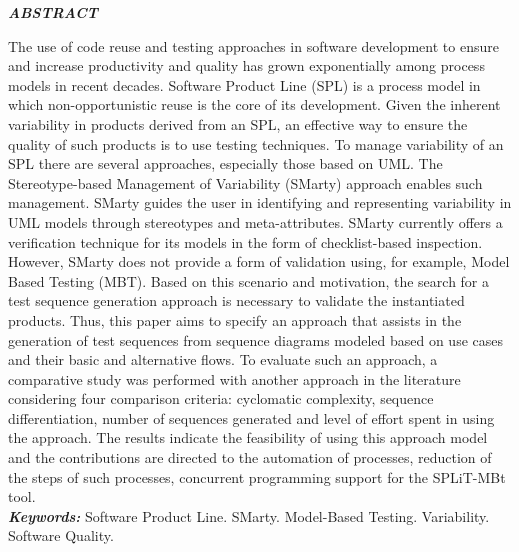 \clearpage
\thispagestyle{empty}

\noindent{\large\bf\dadoTituloAbs}

\normalsize
\begin{center}	
	\vspace*{0.5cm}
	\textbf{\textit{ABSTRACT}}
\end{center}
The use of code reuse and testing approaches in software development to ensure and increase productivity and quality has grown exponentially among process models in recent decades. Software Product Line (SPL) is a process model in which non-opportunistic reuse is the core of its development. Given the inherent variability in products derived from an SPL, an effective way to ensure the quality of such products is to use testing techniques. To manage variability of an SPL there are several approaches, especially those based on UML. The Stereotype-based Management of Variability (SMarty) approach enables such management. SMarty guides the user in identifying and representing variability in UML models through stereotypes and meta-attributes. SMarty currently offers a verification technique for its models in the form of checklist-based inspection. However, SMarty does not provide a form of validation using, for example, Model Based Testing (MBT). Based on this scenario and motivation, the search for a test sequence generation approach is necessary to validate the instantiated products. Thus, this paper aims to specify an approach that assists in the generation of test sequences from sequence diagrams modeled based on use cases and their basic and alternative flows. To evaluate such an approach, a comparative study was performed with another approach in the literature considering four comparison criteria: cyclomatic complexity, sequence differentiation, number of sequences generated and level of effort spent in using the approach. The results indicate the feasibility of using this approach model and the contributions are directed to the automation of processes, reduction of the steps of such processes, concurrent programming support for the SPLiT-MBt tool.
\\

\noindent \textbf{\textit{Keywords:}} Software Product Line. SMarty. Model-Based Testing. Variability. Software Quality.

\pagebreak

 
